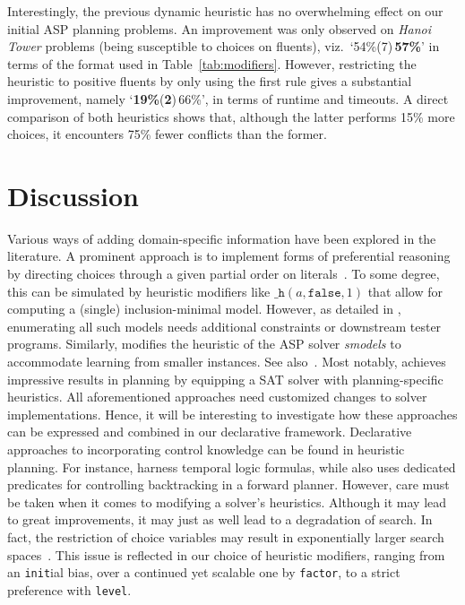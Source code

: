 \documentclass[letterpaper]{article}
\newcommand{\hpredicate}{\texttt{\_h}}
\newcommand{\hpre}[3]{\ensuremath{\hpredicate(#1,{#2},#3)}}
\begin{document}
Interestingly, the previous dynamic heuristic has no overwhelming effect on our initial ASP planning problems.
An improvement was only observed on \textit{Hanoi Tower} problems (being susceptible to choices on fluents),
viz.\ `{54\%}(7)\,\textbf{57\%}' in terms of the format used in Table~\ref{tab:modifiers}.
However, restricting the heuristic to positive fluents by only using the first rule gives a substantial
improvement, namely `\textbf{19\%}(\textbf{2})\,{66\%}', in terms of runtime and timeouts.
A direct comparison of both heuristics shows that, although the latter performs 15\% more choices, 
it encounters 75\% fewer conflicts than the former.



\section{Discussion}\label{sec:discussion}

Various ways of adding domain-specific information have been explored in the literature.
%
A prominent approach is to implement forms of preferential reasoning
by directing choices through
a given partial order on literals~\cite{cacacale96a,rogima10a,giumar12a}.
%
To some degree, this can be simulated by heuristic modifiers like
\hpre{a}{\texttt{false}}{1}
that allow for computing a (single) inclusion-minimal model.
However, as detailed in \cite{rogima10a}, enumerating all such models needs additional constraints
or downstream tester programs.
Similarly,
\cite{balduccini11b} modifies the heuristic of the ASP solver \textit{smodels} to accommodate learning from smaller instances.
See also~\cite{falepf01a,falemari07a}.
Most notably,
\cite{rintanen12a} achieves impressive results in planning by equipping a SAT solver with
planning-specific heuristics.
%
All aforementioned approaches need customized changes to solver implementations.
%
Hence, it will be interesting to investigate how these approaches can be expressed and combined in
our declarative framework.
%
Declarative approaches to incorporating control knowledge can be found in heuristic planning.
For instance, \cite{backab00a} harness temporal logic formulas, while \cite{sierra04a} also uses
dedicated predicates for controlling backtracking in a forward planner.
%
However,
care must be taken when it comes to modifying a solver's heuristics.
Although it may lead to great improvements, it may just as well lead to a degradation of search.
In fact, the restriction of choice variables may result in exponentially larger search spaces~\cite{jajuni05a}.
This issue is reflected in our choice of heuristic modifiers, 
ranging from an \texttt{init}ial bias,
over a continued yet scalable one by \texttt{factor},
to a strict preference with \texttt{level}.
\end{document}
